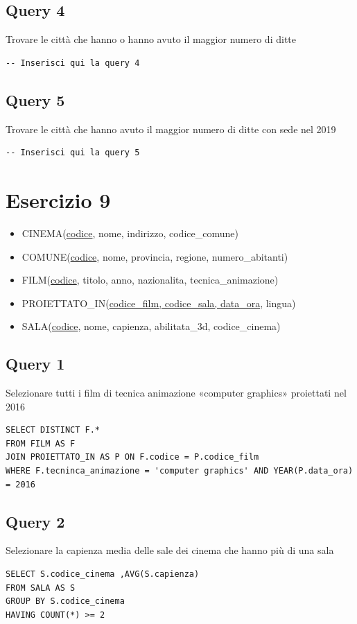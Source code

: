 \subsection{Query 4}
Trovare le città che hanno o hanno avuto il maggior numero di ditte
\begin{lstlisting}
-- Inserisci qui la query 4
\end{lstlisting}

\subsection{Query 5}
Trovare le città che hanno avuto il maggior numero di ditte con sede nel 2019
\begin{lstlisting}
-- Inserisci qui la query 5
\end{lstlisting}

\newpage
\section{Esercizio 9}
\begin{itemize}
    \item CINEMA(\underline{codice}, nome, indirizzo, codice\_comune)
    \item COMUNE(\underline{codice}, nome, provincia, regione, numero\_abitanti)
    \item FILM(\underline{codice}, titolo, anno, nazionalita, tecnica\_animazione)
    \item PROIETTATO\_IN(\underline{codice\_film, codice\_sala, data\_ora}, lingua)
    \item SALA(\underline{codice}, nome, capienza, abilitata\_3d, codice\_cinema)
\end{itemize}

\subsection{Query 1}
Selezionare tutti i film di tecnica animazione «computer graphics» proiettati nel 2016
\begin{lstlisting}
SELECT DISTINCT F.*
FROM FILM AS F
JOIN PROIETTATO_IN AS P ON F.codice = P.codice_film
WHERE F.tecninca_animazione = 'computer graphics' AND YEAR(P.data_ora) = 2016
\end{lstlisting}

\subsection{Query 2}
Selezionare la capienza media delle sale dei cinema che hanno più di una sala
\begin{lstlisting}
SELECT S.codice_cinema ,AVG(S.capienza)
FROM SALA AS S 
GROUP BY S.codice_cinema
HAVING COUNT(*) >= 2
\end{lstlisting}

